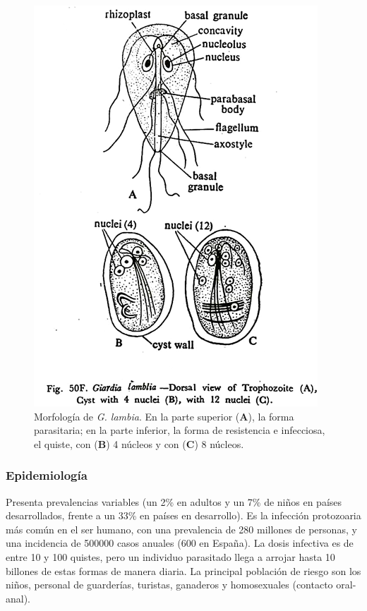 \begin{multicols}{2}
\begin{figure}[H]
		\includegraphics[trim= 0 1cm 0 0,clip,width=0.9\columnwidth]{A.imagenes/ACV-BioSan-Parasit-GlambiaMorf}
		\caption[Morfología de \textit{G. lambia}]{Morfología de \textit{G. lambia}. En la parte superior (\textbf{A}), la forma parasitaria; en la parte inferior, la forma de resistencia e infecciosa, el quiste, con (\textbf{B}) 4 núcleos y con (\textbf{C}) 8 núcleos.\label{fig:PARASIT:GLambiaMorf}}
	\end{figure}
\end{multicols}
\subsubsection{Epidemiología}
Presenta prevalencias variables (un 2\% en adultos y un 7\% de niños en países desarrollados, frente a un 33\% en países en desarrollo). Es la infección protozoaria más común en el ser humano, con una prevalencia de 280 millones de personas, y una incidencia de 500000 casos anuales (600 en España). La dosis infectiva es de entre 10 y 100 quistes, pero un individuo parasitado llega a arrojar hasta 10 billones de estas formas de manera diaria. La principal población de riesgo son los niños, personal de guarderías, turistas, ganaderos y homosexuales (contacto oral-anal).

